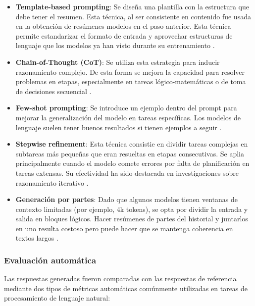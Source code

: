 \documentclass[../main.tex]{subfiles}
\begin{document}
	\begin{itemize}
		\item \textbf{Template-based prompting}: Se diseña una plantilla con la estructura que debe tener el resumen. Esta técnica, al ser consistente en contenido fue usada en la obtención de resúmenes modelos en el paso anterior. Esta técnica permite estandarizar el formato de entrada y aprovechar estructuras de lenguaje que los modelos ya han visto durante su entrenamiento \parencite{brown2020languagemodelsfewshotlearners}. 
		
		\item \textbf{Chain-of-Thought (CoT)}: Se utiliza esta estrategia para inducir razonamiento complejo. De esta forma se mejora la capacidad para resolver problemas en etapas, especialmente en tareas lógico-matemáticas o de toma de decisiones secuencial \parencite{wei2023chainofthoughtpromptingelicitsreasoning}.
		
		\item \textbf{Few-shot prompting}: Se introduce un ejemplo dentro del prompt para mejorar la generalización del modelo en tareas específicas. Los modelos de lenguaje suelen tener buenos resultados si tienen ejemplos a seguir \parencite{parnami2022learningexamplessummaryapproaches}.
		
		\item \textbf{Stepwise refinement}: Esta técnica consistie en dividir tareas complejas en subtareas más pequeñas que eran resueltas en etapas consecutivas. Se aplia principalmente cuando el modelo comete errores por falta de planificación en tareas extensas. Su efectividad ha sido destacada en investigaciones sobre razonamiento iterativo \parencite{sun2024promptchainingstepwiseprompt}.
		
		\item \textbf{Generación por partes}: Dado que algunos modelos tienen ventanas de contexto limitadas (por ejemplo, 4k tokens), se opta por dividir la entrada y salida en bloques lógicos. Hacer resúmenes de partes del historial y juntarlos en uno resulta costoso pero puede hacer que se mantenga coherencia en textos largos \parencite{press2023measuringnarrowingcompositionalitygap}.
	\end{itemize}
	
	
	\subsubsection{Evaluación automática}
	
	Las respuestas generadas fueron comparadas con las respuestas de referencia mediante dos tipos de métricas automáticas comúnmente utilizadas en tareas de procesamiento de lenguaje natural:
	
\end{document}
